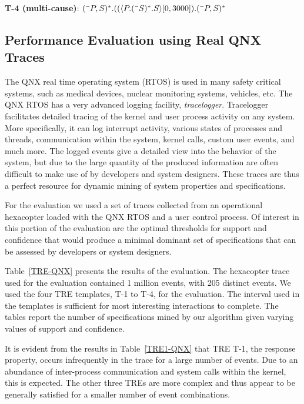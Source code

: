 \documentclass[]{sigplanconf}
\begin{document}
\noindent \textbf{T-4 (multi-cause)}: $(\verb!^!P,S)^*.((\langle P.(\verb!^!S)^*.S\rangle[0, 3000]).(\verb!^!P,S)^*$


\subsection{Performance Evaluation using Real QNX Traces}

The QNX real time operating system (RTOS) is used in many safety critical systems, such as medical devices, nuclear monitoring systems, vehicles, etc. The QNX RTOS has a very advanced logging facility, \emph{tracelogger}. Tracelogger facilitates detailed tracing of the kernel and user process activity on any system. More specifically, it can log interrupt activity, various states of processes and threads, communication within the system, kernel calls, custom user events, and much more. The logged events give a detailed view into the behavior of the system, but due to the large quantity of the produced information are often difficult to make use of by developers and system designers. These traces are thus a perfect resource for dynamic mining of system properties and specifications.

For the evaluation we used a set of traces collected from an operational hexacopter loaded with the QNX RTOS and a user control process. Of interest in this portion of the evaluation are the optimal thresholds for support and confidence that would produce a minimal dominant set of specifications that can be assessed by developers or system designers.

Table~\ref{TRE-QNX} presents the results of the evaluation. The hexacopter trace used for the evaluation contained 1 million events, with 205 distinct events. We used the four TRE templates, T-1 to T-4, for the evaluation. The interval used in the templates is sufficient for most interesting interactions to complete. The tables report the number of specifications mined by our algorithm given varying values of support and confidence.

It is evident from the results in Table~\ref{TRE1-QNX} that TRE T-1, the response property, occurs infrequently in the trace for a large number of events. Due to an abundance of inter-process communication and system calls within the kernel, this is expected. The other three TREs are more complex and thus appear to be generally satisfied for a smaller number of event combinations.
\end{document}

